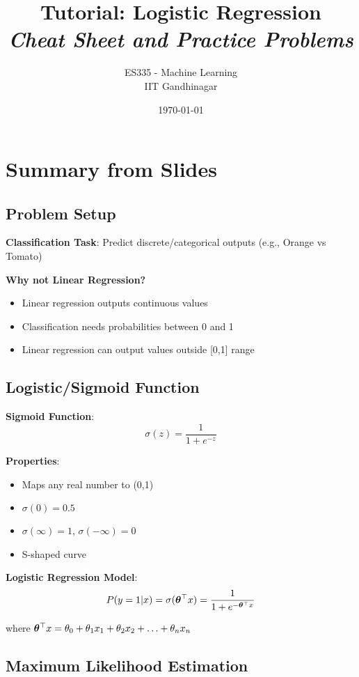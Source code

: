 \documentclass{article}
\title{\textbf{Tutorial: Logistic Regression} \\ \textit{Cheat Sheet and Practice Problems}}
\author{ES335 - Machine Learning \\ IIT Gandhinagar}
\date{\today}
\begin{document}
\maketitle

\section{Summary from Slides}

\subsection{Problem Setup}

\textbf{Classification Task}: Predict discrete/categorical outputs (e.g., Orange vs Tomato)

\textbf{Why not Linear Regression?}
\begin{itemize}
    \item Linear regression outputs continuous values
    \item Classification needs probabilities between 0 and 1
    \item Linear regression can output values outside [0,1] range
\end{itemize}

\subsection{Logistic/Sigmoid Function}

\textbf{Sigmoid Function}:
$$\sigma(z) = \frac{1}{1 + e^{-z}}$$

\textbf{Properties}:
\begin{itemize}
    \item Maps any real number to (0,1)
    \item $\sigma(0) = 0.5$
    \item $\sigma(\infty) = 1$, $\sigma(-\infty) = 0$
    \item S-shaped curve
\end{itemize}

\textbf{Logistic Regression Model}:
$$P(y=1|x) = \sigma(\boldsymbol{\theta}^\top x) = \frac{1}{1 + e^{-\boldsymbol{\theta}^\top x}}$$

where $\boldsymbol{\theta}^\top x = \theta_0 + \theta_1 x_1 + \theta_2 x_2 + \ldots + \theta_n x_n$

\subsection{Maximum Likelihood Estimation}
\end{document}
